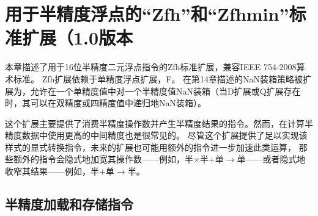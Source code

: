\chapter{用于半精度浮点的“Zfh”和“Zfhmin”标准扩展（1.0版本}

本章描述了用于16位半精度二元浮点指令的Zfh标准扩展，兼容IEEE 754-2008算术标准。
Zfh扩展依赖于单精度浮点扩展，F。
在第14章描述的NaN装箱策略被扩展为，允许在一个单精度值中对一个半精度值NaN装箱（当D扩展或Q扩展存在时，其可以在双精度或四精度值中递归地NaN装箱）。

\begin{commentary}
  这个扩展主要提供了消费半精度操作数并产生半精度结果的指令。然而，在计算半精度数据中使用更高的中间精度也是很常见的。
  尽管这个扩展提供了足以实现该样式的显式转换指令，未来的扩展也可能用额外的指令进一步加速此类运算，
  那些额外的指令会隐式地加宽其操作数——例如，半$\times$半$+$单$\rightarrow$单——或者隐式地收窄其结果——例如，半$+$单$\rightarrow$半。
\end{commentary}

\section{半精度加载和存储指令}

